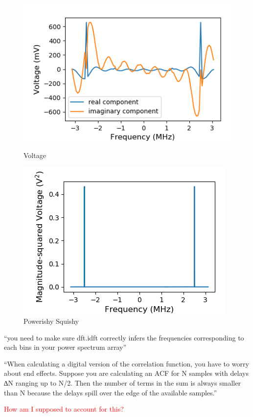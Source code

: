 \documentclass[a4paper]{article}
\begin{document}
\begin{figure}
\centering
\begin{minipage}{.5\textwidth}
	\centering
	\includegraphics[width=.8\linewidth]{5-3/volt3}
	\caption{Voltage}
	\label{fig:Volt3}
\end{minipage}%
\begin{minipage}{.5\textwidth}
	\centering
	\includegraphics[width=.8\linewidth]{5-3/pow3}
	\caption{Powerishy Squishy}
	\label{fig:SyPw3}
\end{minipage}
\end{figure}

``you need to make sure dft.idft correctly infers the frequencies corresponding to each bins in your power spectrum array''

``When calculating a digital version of the correlation function, you have to worry about end effects.
Suppose you are calculating an ACF for N samples with delays ∆N ranging up to N/2. Then the
number of terms in the sum is always smaller than N because the delays spill over the edge of the
available samples.''

\textcolor{red}{How am I supposed to account for this?}
\end{document}
